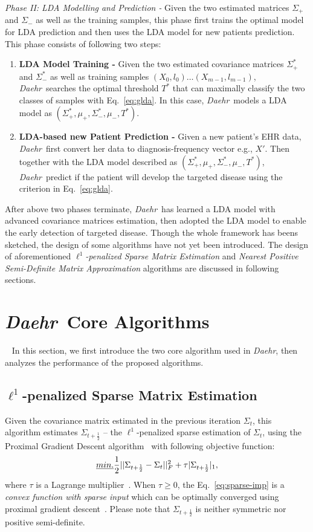 \documentclass[journal,compsoc]{IEEEtran}
\newcommand{\TheName}{\mbox{\emph{Daehr}}}
\begin{document}
\emph{Phase II: LDA Modelling and Prediction - } Given the two estimated matrices $\Sigma_+$ and $\Sigma_-$ as well as the training samples, this phase first trains the optimal model for LDA prediction and then uses the LDA model for new patients prediction. This phase consists of following two steps:
\begin{enumerate}
\item \textbf{LDA Model Training - } Given the two estimated covariance matrices $\Sigma_+^*$ and $\Sigma_-^*$ as well as training samples $(X_0,l_0)\dots (X_{m-1},l_{m-1})$, \TheName\ searches the optimal threshold $T^*$ that can maximally classify the two classes of samples with Eq.~\ref{eq:glda}. In this case, \TheName\ models a LDA model as $(\Sigma_+^*,\mu_+,\Sigma_-^*,\mu_-,T^*)$.
\item \textbf{LDA-based new Patient Prediction - } Given a new patient's EHR data, \TheName\ first convert her data to diagnosis-frequency vector e.g., $X'$. Then together with the LDA model described as $(\Sigma_+^*,\mu_+,\Sigma_-^*,\mu_-,T^*)$, \TheName\ predict if the patient will develop the targeted disease using the criterion in Eq.~\ref{eq:glda}.
\end{enumerate}
%

After above two phases terminate, \TheName\ has learned a LDA model with advanced covariance matrices estimation, then adopted the LDA model to enable the early detection of targeted disease. Though the whole framework has beens sketched, the design of some algorithms have not yet been introduced. The design of aforementioned \emph{$\ell^1$-penalized Sparse Matrix Estimation} and \emph{Nearest Positive Semi-Definite Matrix Approximation} algorithms are discussed in following sections.

\section{\TheName\ Core Algorithms}~\label{sec:4}
In this section, we first introduce the two core algorithm used in \TheName, then analyzes the performance of the proposed algorithms.

\subsection{$\ell^1$-penalized Sparse Matrix Estimation}
Given the covariance matrix estimated in the previous iteration $\Sigma_{t}$, this algorithm estimates $\Sigma_{t+\frac{1}{2}}$ -- the $\ell^1$-penalized sparse estimation of $\Sigma_{t}$, using the Proximal Gradient Descent algorithm~\cite{nesterov2004introductory} with following objective function:   
\begin{equation}
\emph{min. }\frac{1}{2}||\Sigma_{t+\frac{1}{2}}-\Sigma_t||_F^2+\tau |\Sigma_{t+\frac{1}{2}}|_1,
\label{eq:sparse-imp}
\end{equation}
where $\tau$ is a Lagrange multiplier~\cite{wu2009karush}. When $\tau\geq 0$, the Eq.~\ref{eq:sparse-imp} is a \emph{convex function with sparse input} which can be optimally converged using proximal gradient descent~\cite{nesterov2004introductory}. Please note that $\Sigma_{t+\frac{1}{2}}$ is neither symmetric nor positive semi-definite.
\end{document}
